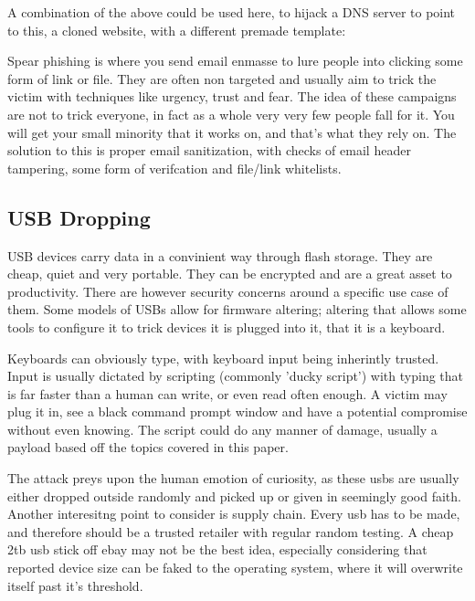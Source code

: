 A combination of the above could be used here, to hijack a DNS server to point to this, a cloned website, with a different premade template:

Spear phishing is where you send email enmasse to lure people into clicking some form of link or file. They are often non targeted and usually aim to trick the victim with techniques like urgency, trust and fear. The idea of these campaigns are not to trick everyone, 
in fact as a whole very very few people fall for it. You will get your small minority that it works on, and that's what they rely on. The solution to this is proper email sanitization, with checks of email header tampering, some form of verifcation and file/link whitelists.

\subsection{USB Dropping}
USB devices carry data in a convinient way through flash storage. They are cheap, quiet and very portable. They can be encrypted and are a great asset to productivity. 
There are however security concerns around a specific use case of them. Some models of USBs allow for firmware altering; altering that allows some tools to configure it to trick
devices it is plugged into it, that it is a keyboard. 

Keyboards can obviously type, with keyboard input being inherintly trusted. Input is usually dictated by scripting (commonly 'ducky script')
with typing that is far faster than a human can write, or even read often enough. A victim may plug it in, see a black command prompt window and have a potential compromise without even knowing. 
The script could do any manner of damage, usually a payload based off the topics covered in this paper. 

The attack preys upon the human emotion of curiosity, as these usbs are usually either dropped outside randomly and picked up or given in seemingly good faith. Another interesitng point to consider is supply chain.
Every usb has to be made, and therefore should be a trusted retailer with regular random testing. A cheap 2tb usb stick off ebay may not be the best idea, especially considering that reported device size can be faked to the operating system,
where it will overwrite itself past it's threshold.


